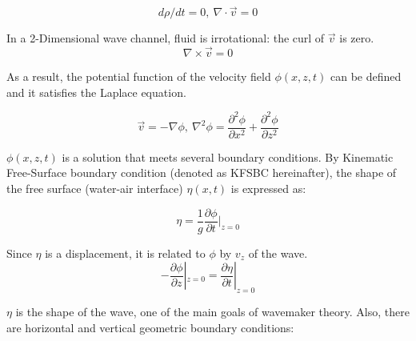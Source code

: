 \begin{equation}
    {d\rho/dt = 0,~\nabla \cdot \vec{v} = 0}\label{eq_002}
\end{equation}

In a 2-Dimensional wave channel, fluid is irrotational: the curl of $\vec{v}$ is zero.
\begin{equation}
    {\nabla \times \vec{v} = 0}\label{eq_004}
\end{equation}

As a result, the potential function of the velocity field $\phi(x, z, t)$ can be defined and it satisfies the Laplace equation.

\begin{equation}
    \vec{v} = - \nabla \phi, ~\nabla^2 \phi = 
    \frac{\partial^2 \phi}{\partial x^2} + 
    \frac{\partial^2 \phi}{\partial z^2}\label{eq_005}
\end{equation}

$\phi(x, z, t)$ is a solution that meets several boundary conditions. By Kinematic Free-Surface boundary condition (denoted as KFSBC hereinafter), the shape of the free surface (water-air interface) $\eta(x, t)$ is expressed as:

\begin{equation}
    \eta = \frac{1}{g} \frac{\partial \phi}{\partial t}|_{z=0}\label{eq_007}
\end{equation}

Since $\eta$ is a displacement, it is related to $\phi$ by $v_{z}$ of the wave.
\begin{equation}
    -\frac{\partial \phi}{\partial z}|_{z=0} = \frac{\partial \eta}{\partial t}|_{z=0}\label{eq_008}
\end{equation}

$\eta$ is the shape of the wave, one of the main goals of wavemaker theory. Also, there are horizontal and vertical geometric boundary conditions:

